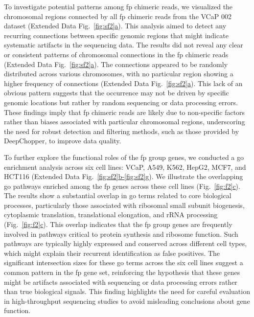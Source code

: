 \documentclass[pdflatex, sn-mathphys-num, lineno]{sn-jnl}%
\newcommand{\figref}[2]{Fig.~\hyperref[#1]{\ref*{#1}#2}}
\newcommand{\edfigref}[2]{Extended Data Fig.~\hyperref[#1]{\ref*{#1}#2}}
\newcommand{\edfigrefrg}[3]{Extended Data Fig.~\hyperref[#1]{\ref*{#1}#2-\ref*{#1}#3}}
\theoremstyle{thmstyleone}%
\theoremstyle{thmstyletwo}%
\theoremstyle{thmstylethree}%
\begin{document}
To investigate potential patterns among \gls{fp} chimeric reads, we visualized the chromosomal regions connected by all \gls{fp} chimeric reads from the VCaP 002 dataset (\edfigref{fig:sf2}{a}).
This analysis aimed to detect any recurring connections between specific genomic regions that might indicate systematic artifacts in the sequencing data.
The results did not reveal any clear or consistent patterns of chromosomal connections in the \gls{fp} chimeric reads  (\edfigref{fig:sf2}{a}).
The connections appeared to be randomly distributed across various chromosomes, with no particular region showing a higher frequency of connections (\edfigref{fig:sf2}{a}).
This lack of an obvious pattern suggests that the occurrence may not be driven by specific genomic locations but rather by random sequencing or data processing errors.
These findings imply that \gls{fp} chimeric reads are likely due to non-specific factors rather than biases associated with particular chromosomal regions, underscoring the need for robust detection and filtering methods, such as those provided by DeepChopper, to improve data quality.

To further explore the functional roles of the \gls{fp} group genes, we conducted a \gls{go} enrichment analysis across six cell lines: VCaP, A549, K562, HepG2, MCF7, and HCT116 (\edfigrefrg{fig:sf2}{b}{g}).
We illustrate the overlapping \gls{go} pathways enriched among the \gls{fp} genes across these cell lines (\figref{fig:f2}{c}).
The results show a substantial overlap in \gls{go} terms related to core biological processes, particularly those associated with ribosomal small subunit biogenesis, cytoplasmic translation, translational elongation, and rRNA processing (\figref{fig:f2}{c}).
This overlap indicates that the \gls{fp} group genes are frequently involved in pathways critical to protein synthesis and ribosome function.
Such pathways are typically highly expressed and conserved across different cell types, which might explain their recurrent identification as false positives.
The significant intersection sizes for these \gls{go} terms across the six cell lines suggest a common pattern in the \gls{fp} gene set, reinforcing the hypothesis that these genes might be artifacts associated with sequencing or data processing errors rather than true biological signals.
This finding highlights the need for careful evaluation in high-throughput sequencing studies to avoid misleading conclusions about gene function.
\end{document}
